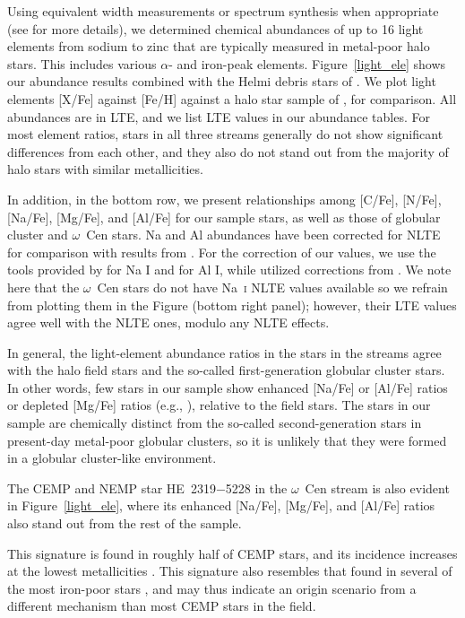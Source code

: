 \documentclass[twocolumn]{aastex63}
\begin{document}
Using equivalent width measurements or spectrum synthesis when appropriate (see \citealt{gull18} for more details), we determined chemical abundances of up to 16 light elements from sodium to zinc that are typically measured in metal-poor halo stars. This includes various $\alpha$- and iron-peak elements. Figure~\ref{light_ele} shows our abundance results combined with the Helmi debris stars of \citet{Roederer10}. We plot light elements [X/Fe] against [Fe/H] against a 
halo star sample of \citet{Yong13a}, for comparison. All abundances are in LTE, and we list LTE values in our abundance tables. For most element ratios, stars in all three streams generally do not show significant differences from each other, and they also do not stand out from the majority of halo stars with similar metallicities. 

In addition, in the bottom row, we present relationships among [C/Fe], [N/Fe], [Na/Fe], [Mg/Fe], and [Al/Fe] for our sample stars, as well as those of globular cluster and $\omega$~Cen stars. Na and Al abundances have been corrected for NLTE for comparison with results from \citet{carretta09}. For the correction of our values, we use the tools provided by \citealt{Lind11} for Na I and \citealt{nordlander17} for Al I, while \citet{carretta09} utilized corrections from \citet{gratton99}. We note here that the \citet{Johnson10} $\omega$~Cen stars do not have Na~\textsc{i} NLTE values available so we refrain from plotting them in the Figure (bottom right panel); however, their LTE values agree well with the \citet{carretta09} NLTE ones, modulo any NLTE effects.

In general, the light-element abundance ratios in the stars in the streams agree with the halo field stars and the so-called first-generation globular cluster stars.
In other words, few stars in our sample show enhanced [Na/Fe] or [Al/Fe] ratios or depleted [Mg/Fe] ratios
(e.g., \citealt{carretta09mgal}), relative to the field stars.
The stars in our sample are chemically distinct from the so-called second-generation stars in present-day metal-poor globular clusters, 
so it is unlikely that they were formed in a globular cluster-like environment.

The CEMP and NEMP star \mbox{HE~2319$-$5228} in the $\omega$~Cen stream is also evident in Figure~\ref{light_ele}, where its enhanced [Na/Fe], [Mg/Fe], and [Al/Fe] ratios also stand out from the rest of the sample.

This signature is found in roughly half of CEMP stars,
and its incidence increases at the lowest metallicities
\citep{Norris13}.
This signature also resembles that found in several of the most iron-poor stars \citep{christlieb02, frebel05}, and may thus indicate an origin scenario from a different mechanism than most CEMP stars in the field.
\end{document}
